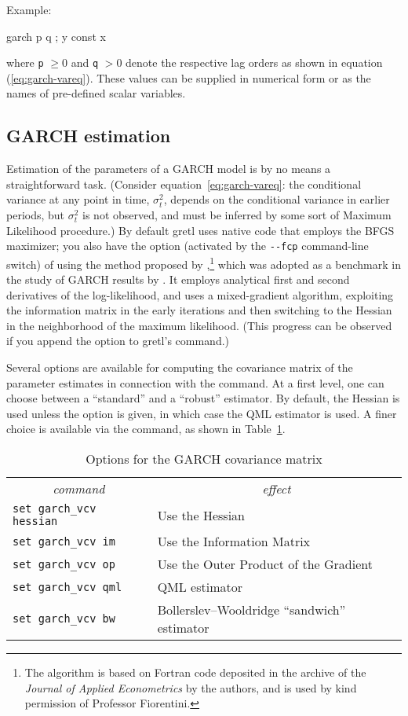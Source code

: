 Example:
\begin{code}
garch p q ; y const x
\end{code}
where \verb|p| $\ge 0$ and \verb|q| $>0$ denote the respective lag
orders as shown in equation (\ref{eq:garch-vareq}).  These values
can be supplied in numerical form or as the names of pre-defined
scalar variables.

\subsection{GARCH estimation}
\label{subsec:garch-est}

Estimation of the parameters of a GARCH model is by no means a
straightforward task.  (Consider equation~\ref{eq:garch-vareq}: the
conditional variance at any point in time, $\sigma^2_t$, depends on
the conditional variance in earlier periods, but $\sigma^2_t$ is not
observed, and must be inferred by some sort of Maximum Likelihood
procedure.)  By default gretl uses native code that employs the
BFGS maximizer; you also have the option (activated by the
\verb|--fcp| command-line switch) of using the method proposed by
\cite{fiorentini96},\footnote{The algorithm is based on Fortran code
  deposited in the archive of the \textit{Journal of Applied
    Econometrics} by the authors, and is used by kind permission of
  Professor Fiorentini.} which was adopted as a benchmark in the study
of GARCH results by \cite{mccullough98}.  It employs analytical first
and second derivatives of the log-likelihood, and uses a
mixed-gradient algorithm, exploiting the information matrix in the
early iterations and then switching to the Hessian in the neighborhood
of the maximum likelihood.  (This progress can be observed if you
append the  option to gretl's 
command.)

Several options are available for computing the covariance matrix of
the parameter estimates in connection with the  command.
At a first level, one can choose between a ``standard'' and a
``robust'' estimator.  By default, the Hessian is used unless the
 option is given, in which case the QML estimator is
used.  A finer choice is available via the  command, as
shown in Table~\ref{tab:garch-vcv}.

\begin{table}[htbp]
\caption{Options for the GARCH covariance matrix}
\label{tab:garch-vcv}
\begin{center}
\begin{tabular}{ll}
\multicolumn{1}{c}{\textit{command}} &
\multicolumn{1}{c}{\textit{effect}} \\ [4pt]
\texttt{set garch\_vcv hessian} & Use the Hessian \\
\texttt{set garch\_vcv im} & Use the Information Matrix \\
\texttt{set garch\_vcv op} & Use the Outer Product of the Gradient \\
\texttt{set garch\_vcv qml} & QML estimator \\
\texttt{set garch\_vcv bw} & Bollerslev--Wooldridge ``sandwich'' estimator
\end{tabular}
\end{center}
\end{table}

